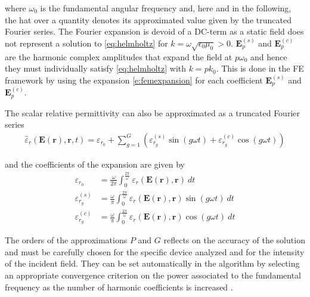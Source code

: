 \documentclass[journal]{IEEEtran}
\renewcommand{\vec}[1]{\mathbf{#1}}
\begin{document}
\noindent where $\omega_0$ is the fundamental angular frequency and, here and in
the following, the hat over a quantity denotes its approximated value given by
the truncated Fourier series. The Fourier expansion is devoid of a DC-term as a
static field does not represent a solution to \eqref{eq:helmholtz} for $k = \omega \sqrt{\epsilon_0 \mu_0} >
0$. $\vec{E}_{p}^{(s)}$ and $\vec{E}_{p}^{(c)}$ are the harmonic complex
amplitudes that expand the field at $p\omega_0$ and hence they must individually
satisfy \eqref{eq:helmholtz} with $k=pk_0$. This is done in the FE framework
by using the expansion \eqref{e:femexpansion} for each coefficient $\vec{E}_{p}^{(s)}$ and
$\vec{E}_{p}^{(c)}$.

The scalar relative permittivity can also be approximated as a truncated Fourier series 
%
\begin{eqnarray} \label{eq:eps}
\hat{{\varepsilon}}_r(\vec{E}(\vec{r}), \vec{r}, t) = {\varepsilon}_{r_0} + \sum^G_{g=1} 
\left( {\varepsilon}_{r_g}^{(s)} \sin(g \omega t) + {\varepsilon}_{r_g}^{(c)} \cos(g \omega t)
\right)
\end{eqnarray} 

\noindent and the coefficients of the expansion are given by
\begin{align} \label{eq:epsCoeffs}
{\varepsilon}_{r_{0}} &=  \frac{\omega}{2\pi}\int_0^{\frac{2\pi}{\omega}}
{\varepsilon}_r(\vec{E}(\vec{r}), \vec{r}) \ dt \nonumber \\
{\varepsilon}_{r_{g}}^{(s)} &=  \frac{\omega}{\pi}\int_0^{\frac{2\pi}{\omega}}
{\varepsilon}_r(\vec{E}(\vec{r}), \vec{r}) \sin(g \omega t) \ dt \\ 
{\varepsilon}_{r_{g}}^{(c)} &=  \frac{\omega}{\pi}\int_0^{\frac{2\pi}{\omega}} 
{\varepsilon}_r(\vec{E}(\vec{r}), \vec{r}) \cos(g \omega t) \ dt
\nonumber 
\end{align} 

The orders of the approximations $P$ and $G$ reflects on the accuracy
of the solution and must be carefully chosen for the specific device
analyzed and for the intensity of the incident field. They can be set
automatically in the algorithm by selecting an appropriate convergence criterion
on the power associated to the fundamental frequency as the number of harmonic
coefficients is increased \cite{Gyselinck2002}.
\end{document}
